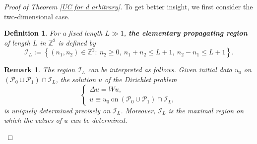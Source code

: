 \documentclass[11pt,reqno,UTF8,twoside]{amsart}
\newcommand{\Z}{\mathbb{Z}}
\newcommand{\mcP}{\mathcal{P}}
\newcommand{\mcI}{\mathcal{I}}
\newtheorem{Def}{Definition}[section]
\newtheorem{rmk}{\bf Remark}[section]
\theoremstyle{definition}
\numberwithin{equation}{section}
\begin{document}
\begin{proof}[Proof of Theorem \ref{UC for d arbitrary}]
To get  better insight, we first consider the two-dimensional case.
  
\begin{Def}
For a fixed length $L\gg 1$, \textbf{the elementary propagating region} of length $L$ in $\Z^2$ is defined by 
\[\mcI_L:= \left\{ (n_1,n_2)\in \Z^2: \ n_2\geq 0 ,\ n_1+ n_2 \leq L+1, \  n_2-n_1 \leq L+1    \right\}. \]   

\end{Def}

\begin{rmk}
The region $\mcI_L$ can be interpreted as follows. Given initial data $u_0$ on $(\mcP_0\cup \mcP_1)\cap \mcI_L$, the solution $u$ of the Dirichlet problem
\begin{equation*}
\begin{cases}
\Delta u = W u, \\
u \equiv u_0 \ \text{on} \ (\mcP_0\cup\mcP_1)\cap \mcI_L,
\end{cases}
\end{equation*}
is uniquely determined precisely on $\mcI_L$. Moreover, $\mcI_L$ is the maximal region on which the values  of $u$ can be determined.
\end{rmk}


\end{proof}
\end{document}
